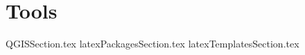 \documentclass[class=book , crop=false]{standalone} %
\title{}  %
\begin{document}
\maketitle
\chapter{Tools}

{QGISSection.tex}
{latexPackagesSection.tex}
{latexTemplatesSection.tex}
\end{document}
